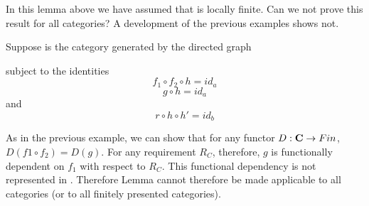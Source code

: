 In this lemma above we have assumed that \catcw is locally finite. Can we not prove this result for all categories? A development of the previous examples shows not.
\begin{example}
Suppose \catcw is the category generated by the directed graph

subject to the identities
\begin{equation}
\label{fdcounterfhidentity}
f_1 \circ f_2 \circ h = id_a
\end{equation}
\begin{equation}
\label{fdcounterghidentity}
g \circ h = id_a
\end{equation}
and 
\begin{equation}
\label{fdcounterrhhpidentity}
r \circ h \circ h' = id_b
\end{equation}

As in the previous example, we can show that for any functor $D:\textbf{C} \rightarrow Fin$, $D(f1 \circ f_2)=D(g)$. For any requirement 
$R_C$, therefore,  $g$ is functionally dependent on $f_1$ 
with respect to $R_C$. This functional dependency  
is not represented in \catc. Therefore Lemma  cannot therefore be made applicable to all categories (or to all finitely presented categories).

\end{example}

